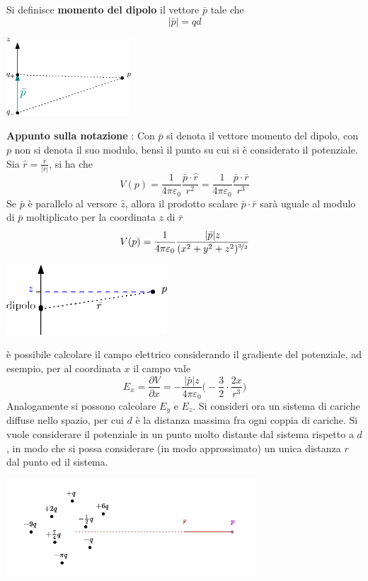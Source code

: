 \documentclass[10pt, letterpaper]{report}
\begin{document}
Si definisce \textbf{momento del dipolo} il vettore $\bar p$ tale che $$ |\bar p|=qd$$
\begin{center}
    \includegraphics[width=0.35\textwidth]{images/momentoDipolo.eps}
\end{center} 
\textbf{Appunto sulla notazione} : Con $\bar p$ si denota il vettore momento del dipolo, con $p$ non si denota il suo modulo, bensì il punto su cui si è considerato il potenziale.\acc
Sia $\hat r = \frac{\bar r}{|\bar r|}$, si ha che 
$$V(p)=\frac{1}{4\pi \varepsilon_0} \frac{\bar p \cdot \hat r}{r^2}= 
\frac{1}{4\pi \varepsilon_0} \frac{\bar p \cdot \bar  r}{r^3}$$
Se $\bar p$ è parallelo al versore $\hat z$, allora il prodotto scalare $\bar p \cdot \bar r$ sarà uguale al modulo di $\bar p$ moltiplicato per la coordinata $z$ di $\bar r$ 
$$V(p)=\frac{1}{4\pi \varepsilon_0} \frac{|\bar p|z}{(x^2+y^2+z^2)^{\nicefrac{3}{2}}}$$
\begin{center}
    \includegraphics[width=0.45\textwidth]{images/MomentoDipolo2.eps}
\end{center} 
è possibile calcolare il campo elettrico considerando il gradiente del potenziale, ad esempio, per al coordinata $x$ il campo vale 
$$ E_x=\frac{\partial V}{\partial x}= 
-\frac{|\bar p|z}{4\pi\varepsilon_0}\Big( -\frac{3}{2}\cdot \frac{2x}{r^3} \Big)
$$
Analogamente si possono calcolare $E_y$ e $E_z$.\acc 
Si consideri ora un sistema di cariche diffuse nello spazio, per cui $d$ è la distanza massima fra ogni coppia di cariche. Si vuole considerare il potenziale in un punto molto distante dal sistema rispetto a $d$, in modo che si possa considerare (in modo approssimato) un unica distanza $r$ dal punto ed il sistema. 
\begin{center}
    \includegraphics[width=0.7\textwidth]{images/sistemaCariche.pdf}
\end{center} 
\end{document}
